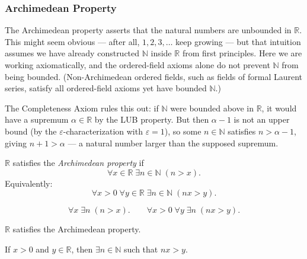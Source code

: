 \subsubsection{Archimedean Property}

\begin{remark*}
The Archimedean property asserts that the natural numbers are unbounded in $\mathbb{R}$.
This might seem obvious --- after all, $1, 2, 3, \ldots$ keep growing --- but
that intuition assumes we have already constructed $\mathbb{N}$ inside $\mathbb{R}$
from first principles. Here we are working axiomatically, and the ordered-field
axioms alone do not prevent $\mathbb{N}$ from being bounded. (Non-Archimedean
ordered fields, such as fields of formal Laurent series, satisfy all ordered-field
axioms yet have bounded $\mathbb{N}$.)

The Completeness Axiom rules this out: if $\mathbb{N}$ were bounded above in
$\mathbb{R}$, it would have a supremum $\alpha \in \mathbb{R}$ by the LUB
property. But then $\alpha - 1$ is not an upper bound (by the
$\varepsilon$-characterization with $\varepsilon = 1$), so some $n \in \mathbb{N}$
satisfies $n > \alpha - 1$, giving $n + 1 > \alpha$ --- a natural number larger
than the supposed supremum.
\end{remark*}

\begin{tcolorbox}[colback=propbox, colframe=propborder, arc=2pt,
  left=6pt, right=6pt, top=4pt, bottom=4pt,
  title={\small\textbf{Definition}},
  fonttitle=\small\bfseries]
$\mathbb{R}$ satisfies the \emph{Archimedean property} if
\[
\forall x \in \mathbb{R}\; \exists n \in \mathbb{N}\; (n > x).
\]
Equivalently:
\[
\forall x > 0\; \forall y \in \mathbb{R}\; \exists n \in \mathbb{N}\; (nx > y).
\]
\end{tcolorbox}

\begin{remark*}
\[
\forall x\; \exists n\; (n > x).
\qquad
\forall x > 0\; \forall y\; \exists n\; (nx > y).
\]
\end{remark*}

\begin{theorem}
\label{thm:archimedean-property}
$\mathbb{R}$ satisfies the Archimedean property.
\end{theorem}



\begin{corollary}
If $x > 0$ and $y \in \mathbb{R}$, then $\exists n \in \mathbb{N}$ such that
$nx > y$.
\end{corollary}




